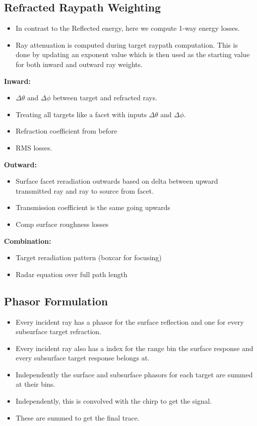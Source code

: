 \documentclass[lettersize,journal]{IEEEtran}
\begin{document}
\label{sec:RefrWeight}
\subsection{Refracted Raypath Weighting}

\begin{itemize}
    \item In contrast to the Reflected energy, here we compute 1-way energy losses.
    \item Ray attenuation is computed during target raypath computation. This is done by updating an exponent value which is then used as the starting value for both inward and outward ray weights. 
\end{itemize}

\textbf{Inward:}
\begin{itemize}
    \item $\Delta \theta$ and $\Delta \phi$ between target and refracted rays. 
    \item Treating all targets like a facet with inputs $\Delta \theta$ and $\Delta \phi$.
    \item Refraction coefficient from before
    \item RMS losses. 
\end{itemize}

\textbf{Outward:}
\begin{itemize}
    \item Surface facet reradiation outwards based on delta between upward transmitted ray and ray to source from facet. 
    \item Transmission coefficient is the same going upwards
    \item Comp surface roughness losses
\end{itemize}

\textbf{Combination:}
\begin{itemize}
    \item Target reradiation pattern (boxcar for focusing)
    \item Radar equation over full path length
\end{itemize}

\subsection{Phasor Formulation}
\begin{itemize}
    \item Every incident ray has a phasor for the surface reflection and one for every subsurface target refraction. 
    \item Every incident ray also has a index for the range bin the surface response and every subsurface target response belongs at.
    \item Independently the surface and subsurface phasors for each target are summed at their bins. 
    \item Independently, this is convolved with the chirp to get the signal.
    \item These are summed to get the final trace. 
\end{itemize}
\end{document}
